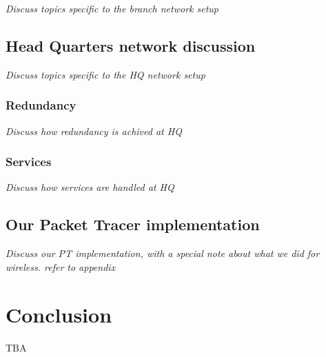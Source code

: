 \textit{Discuss topics specific to the branch network setup}

\subsection{Head Quarters network discussion}

\textit{Discuss topics specific to the HQ network setup}

\subsubsection{Redundancy}

\textit{Discuss how redundancy is achived at HQ}

\subsubsection{Services}

\textit{Discuss how services are handled at HQ}

\subsection{Our Packet Tracer implementation}

\textit{Discuss our PT implementation, with a special note about what we did for wireless. refer to appendix}

\section{Conclusion}
TBA


\clearpage %

\nocite{*}





\clearpage %
\appendix


